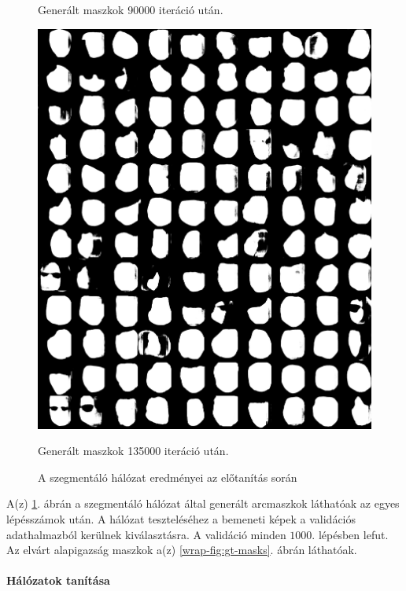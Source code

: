 \documentclass[12pt,a4]{article}
\begin{document}
\begin{figure}[h!]
\begin{minipage}[b]{0.4\textwidth}
            \caption{Generált maszkok 90000 iteráció után.}
          \end{minipage}
          \hfill
          \begin{minipage}[b]{0.4\textwidth}
            \includegraphics[width=\textwidth]{test-masks-135000.png}
            \caption{Generált maszkok 135000 iteráció után.}
          \end{minipage}
          \caption{\centering A szegmentáló hálózat eredményei az előtanítás során}
          \label{fig:trainset-mask}
        \end{figure}

        
        
        A(z) \ref{fig:trainset-mask}. ábrán a szegmentáló hálózat által generált arcmaszkok láthatóak az egyes lépésszámok után. A hálózat teszteléséhez a bemeneti képek a validációs adathalmazból kerülnek kiválasztásra. A validáció minden $1000$. lépésben lefut. Az elvárt alapigazság maszkok a(z) \ref{wrap-fig:gt-masks}. ábrán láthatóak. 

        \clearpage

        \paragraph{Hálózatok tanítása}
\end{document}
